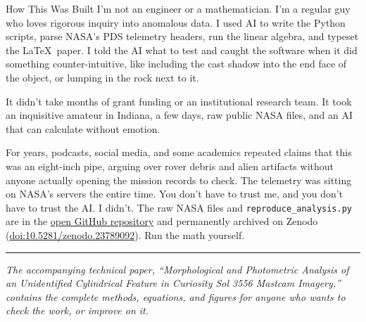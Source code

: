 \documentclass[11pt,a4paper]{article}
\begin{document}
\vspace{0.6em}
\begin{methodbox}{How This Was Built}
I'm not an engineer or a mathematician. I'm a regular guy who loves rigorous inquiry into anomalous data. I used AI to write the Python scripts, parse NASA's PDS telemetry headers, run the linear algebra, and typeset the \LaTeX\ paper. I told the AI what to test and caught the software when it did something counter-intuitive, like including the cast shadow into the end face of the object, or lumping in the rock next to it.

\medskip
It didn't take months of grant funding or an institutional research team. It took an inquisitive amateur in Indiana, a few days, raw public NASA files, and an AI that can calculate without emotion.

\medskip
For years, podcasts, social media, and some academics repeated claims that this was an eight-inch pipe, arguing over rover debris and alien artifacts without anyone actually opening the mission records to check. The telemetry was sitting on NASA's servers the entire time. You don't have to trust me, and you don't have to trust the AI. I didn't. The raw NASA files and \texttt{reproduce\_analysis.py} are in the \href{https://github.com/cambrianminds/martian-cylinder}{open GitHub repository} and permanently archived on Zenodo (\href{https://doi.org/10.5281/zenodo.23789092}{doi:10.5281/zenodo.23789092}). Run the math yourself.

\medskip\noindent\textcolor{bordersubtle}{\rule{\linewidth}{0.6pt}}\medskip

\small\color{slatemuted}\textit{The accompanying technical paper, ``Morphological and Photometric Analysis of an Unidentified Cylindrical Feature in Curiosity Sol 3556 Mastcam Imagery,'' contains the complete methods, equations, and figures for anyone who wants to check the work, or improve on it.}
\end{methodbox}
\end{document}
